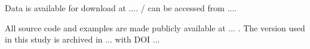 \documentclass[%
 reprint,
 amsmath,amssymb,
 aps,
]{revtex4-2}
\begin{document}
Data is available for download at ....  / can be accessed from ....

All source code and examples are made publicly available at ... . The version used in this study is archived in ... with DOI ... 



\noindent
{}





\end{document}
